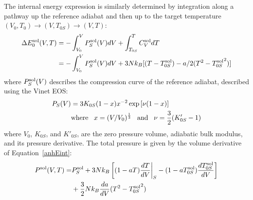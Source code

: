 The internal energy expression is similarly determined by integration along a pathway up the reference adiabat and then up to the target temperature $(V_0,T_0) \rightarrow (V,T_{0S}) \rightarrow (V,T)$:
\begin{equation}
  \begin{split}
    \Delta E_0^{\rm sol}(V,T) &= -\int_{V_0}^V  P_S^{\rm sol}(V) dV + \int_{T_{0S}}^{T} C_V^{\rm sol} dT \\
    &= -\int_{V_0}^V  P_S^{\rm sol}(V) dV + 3N k_B [ (T-T_{0S}^{\rm sol}) - a/2(T^2 - {T_{0S}^{\rm sol}}^2) ]
  \end{split}
  \label{anhEint}
\end{equation}
where $P_S^{\rm sol}(V)$ describes the compression curve of the reference adiabat, described using the Vinet EOS:
\begin{equation}
  \begin{split}
    P_S(V) &= 3K_{0S}(1-x)x^{-2}\exp\left[\nu(1-x)\right]\\
    & {\rm where} \;\;\; x=(V/V_0)^{\frac13} \;\;\; {\rm and} \;\;\; \nu=\frac{3}{2}(K'_{0S}-1)
  \end{split}
  \label{eq:vinet}
\end{equation}
where $V_0$, $K_{0S}$, and $K'_{0S}$, are the zero pressure volume, adiabatic bulk modulus, and its pressure derivative.
The total pressure is given by the volume derivative of Equation~\eqref{anhEint}:
\begin{equation}
  \begin{split}
  P^{\rm sol}(V,T)  = & P_S^{\rm sol} + 3N k_B\left[(1-aT)\frac{dT}{dV}\bigg|_S -  (1-aT_{0S}^{\rm sol})\frac{dT_{0S}^{\rm sol}}{dV} \right]\\
  & + \frac{3}{2}N k_B \frac{da}{dV}(T^2 - {T_{0S}^{\rm sol}}^2)
  \end{split}
\end{equation}
%
